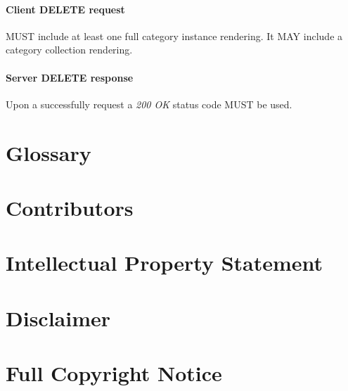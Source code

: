 \documentclass[10pt,a4paper]{article}
\begin{document}
\paragraph{Client DELETE request}
MUST include at least one full category instance rendering. It MAY include a category collection rendering.

\paragraph{Server DELETE response}
Upon a successfully request a \emph{200 OK} status code MUST be used.

\section{Glossary}
\label{sec:glossary}


\section{Contributors}


\section{Intellectual Property Statement}


\section{Disclaimer}


\section{Full Copyright Notice}




\end{document}
